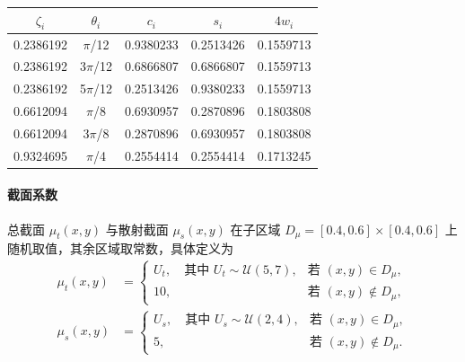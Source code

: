 \begin{table}[!htp]
    \centering
    \begin{tabular}{ccccc}
        \toprule
        $\zeta_i$ & $\theta_i$ & $c_i$     & $s_i$     & $4 w_i$   \\
        \midrule
        0.2386192 & $\pi$/12   & 0.9380233 & 0.2513426 & 0.1559713 \\
        0.2386192 & 3$\pi$/12  & 0.6866807 & 0.6866807 & 0.1559713 \\
        0.2386192 & 5$\pi$/12  & 0.2513426 & 0.9380233 & 0.1559713 \\
        0.6612094 & $\pi$/8    & 0.6930957 & 0.2870896 & 0.1803808 \\
        0.6612094 & 3$\pi$/8   & 0.2870896 & 0.6930957 & 0.1803808 \\
        0.9324695 & $\pi$/4    & 0.2554414 & 0.2554414 & 0.1713245 \\
        \bottomrule
    \end{tabular}
    \label{tab:quadrature}
\end{table}

\paragraph{截面系数}
总截面 $\mu_t(x,y)$ 与散射截面 $\mu_s(x,y)$ 在子区域 $D_\mu = [0.4, 0.6] \times [0.4, 0.6]$ 上随机取值，其余区域取常数，具体定义为
\begin{equation} \label{eq:coefficients_definition}
    \begin{aligned}
        \mu_t(x,y) & =
        \begin{cases}
            U_t, \quad \text{其中 } U_t \sim \mathcal{U}(5,7), & \text{若 } (x,y) \in D_\mu,    \\
            10,                                              & \text{若 } (x,y) \notin D_\mu,
        \end{cases} \\
        \mu_s(x,y) & =
        \begin{cases}
            U_s, \quad \text{其中 } U_s \sim \mathcal{U}(2,4), & \text{若 } (x,y) \in D_\mu,    \\
            5,                                               & \text{若 } (x,y) \notin D_\mu.
        \end{cases}
    \end{aligned}
\end{equation}

